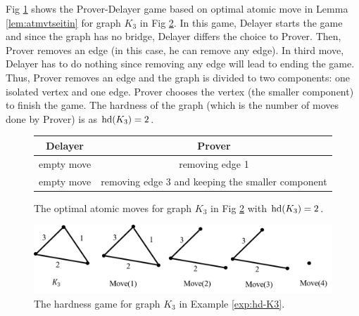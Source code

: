 \documentclass{report}
\begin{document}
\begin{examp}\label{exp:hd-K3}
Fig \ref{fig:game1} shows the Prover-Delayer game based on optimal atomic move in Lemma \ref{lem:atmvtseitin} for graph $K_3$ in Fig \ref{fig:hd1}. In this game, Delayer starts the game and since the graph has no bridge, Delayer differs the choice to Prover. Then, Prover removes an edge (in this case, he can remove any edge). In third move, Delayer has to do nothing since removing any edge will lead to ending the game. Thus, Prover removes an edge and the graph is divided to two components: one isolated vertex and one edge. Prover chooses the vertex (the smaller component) to finish the game. The hardness of the graph (which is the number of moves done by Prover) is as $\operatorname{hd}(K_3)=2$.
  \begin{figure}%
  \centering
  \begin{tabular}{|c|c|} 
                  \hline
                  Delayer & Prover \\ \hline
                  empty move & removing edge 1  \\ \hline
                  empty move & removing edge 3 and keeping the smaller component \\ \hline
  \end{tabular}
  \caption{The optimal atomic moves for graph $K_3$ in Fig \ref{fig:hd1} with $\operatorname{hd}(K_3)=2$.}  \label{fig:game1}
  \end{figure}
  \begin{figure}
  \begin{center}
  \includegraphics[scale =0.45]{g1.png}
  \caption{The hardness game for graph $K_3$ in Example \ref{exp:hd-K3}.} \label{fig:hd1}
  \end{center}
  \end{figure}
\end{examp}
\end{document}
